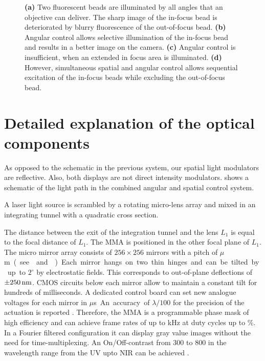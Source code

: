 \begin{figure}[!hbt]
  \centering
  \def\svgscale{.43}
  
  \caption{{\bf (a)} Two fluorescent beads are illuminated by all
    angles that an objective can deliver. The sharp image of the
    in-focus bead is deteriorated by blurry fluorescence of the
    out-of-focus bead. {\bf (b)} Angular control allows selective
    illumination of the in-focus bead and results in a better image on
    the camera. {\bf (c)} Angular control is insufficient, when an
    extended in focus area is illuminated. {\bf (d)} However,
    simultaneous spatial and angular control allows sequential
    excitation of the in-focus beads while excluding the out-of-focus
    bead.}
  \label{fig:hourglass-all}
\end{figure}

\section{Detailed explanation of the optical components}

As opposed to the schematic in the previous system, our spatial light
modulators are reflective.  Also, both displays are not direct
intensity modulators.   shows a schematic of the
light path in the combined angular and spatial control system.

A laser light source is scrambled by a rotating micro-lens array and
mixed in an integrating tunnel with a quadratic cross section.

The distance between the exit of the integration tunnel and the lens
$L_1$ is equal to the focal distance of $L_1$. The MMA is positioned
in the other focal plane of $L_1$. The micro mirror array
\citep{Schmidt2010,Berndt2010} consists of $256\times 256$ mirrors
with a pitch of \unit[16]{$\mu$m} (see  and
). Each mirror hangs on two thin hinges and
can be tilted by up to $2^\circ$ by electrostatic fields. This
corresponds to out-of-plane deflections of $\pm\unit[250]{nm}$.  CMOS
circuits below each mirror allow to maintain a constant tilt for
hundreds of milliseconds. A dedicated control board can set new
analogue voltages for each mirror in \unit[850]{$\mu$s}. An accuracy
of $\lambda/100$ for the precision of the actuation is reported
\citep{Berndt2011}. Therefore, the MMA is a programmable phase mask of
high efficiency and can achieve frame rates of up to \unit[1]{kHz} at
duty cycles up to \unit[50]{\%}. In a Fourier filtered configuration
it can display gray value images without the need for
time-multiplexing.  An On/Off-contrast from 300 to 800 in the
wavelength range from the UV upto NIR can be achieved
\citep{Bernd2011}.

